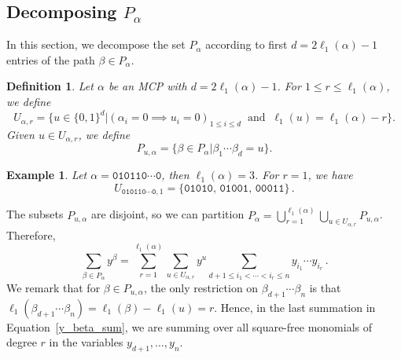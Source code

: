 \documentclass[10pt,a4paper]{article}
\newtheorem{definition}{Definition}[section]
\newtheorem{example}{Example}[section]
\begin{document}
\subsection{Decomposing $P_\alpha$} \label{path_partition}
In this section, we decompose the set $P_\alpha$ according to first $d=2\ell_1(\alpha)-1$ entries of the path $\beta\in P_\alpha$.
\begin{definition} \label{u_alphar}
	Let $\alpha$ be an MCP with $d = 2\ell_1(\alpha)-1$. For $1 \leq r \leq \ell_1(\alpha)$, we define
		\begin{equation}
		U_{\alpha, r} = \big \{ u\in \{0,1\}^d \big | ( \alpha_i = 0 \implies u_i = 0)_{1 \leq i \leq d}\  \text{ and }\   \ell_1(u) = \ell_1(\alpha) -r  \big \}.
		 \label{u_alpha_eqn}
	\end{equation}
	Given $u \in U_{\alpha,r}$, we define
	\begin{equation}
		P_{u, \alpha} = \big\{ \beta\in P_\alpha \big|  \beta_{1} \cdots \beta_d=u  \big\}. 
		\label{p_u_alpha_eqn}
	\end{equation}
\end{definition}
\begin{example} \label{u_alpha_example}
	Let $\alpha = \texttt{010110} \cdots \texttt{0}$, then $\ell_1(\alpha)=3$. For $r =1$, we have
		\begin{equation*} 
		U_{\texttt{010110} \cdots \texttt{0},1} = \{\texttt{01010, 01001, 00011}\}\,.
	\end{equation*}
\end{example} 
The subsets $P_{u, \alpha}$ are disjoint, so we can partition $P_\alpha = \bigcup_{r = 1}^{\ell_1(\alpha)} \bigcup_{u \in U_{\alpha,r}} P_{u,\alpha}$. Therefore, 
\begin{equation} \label{y_beta_sum}
	\sum_{\beta \in P_\alpha} y^ \beta   = \sum_{r=1}^{\ell_1(\alpha)} \sum_{u \in U_{\alpha,r}} y^u
										\sum_{d+1 \leq i_1 < \cdots < i_r \leq n} y_{i_1} \cdots y_{i_{r}}   \,.
\end{equation} 
We remark that for $\beta\in P_{u, \alpha}$, the only restriction on $\beta_{d+1}\cdots\beta_n$ is that $\ell_1(\beta_{d+1}\cdots\beta_n)=\ell_1(\beta)-\ell_1(u)=r$.
Hence, in the last  summation in Equation~\eqref{y_beta_sum},  we are summing over all square-free monomials of degree $r$ in the variables $y_{d+1},\dots,y_n$.
\end{document}
